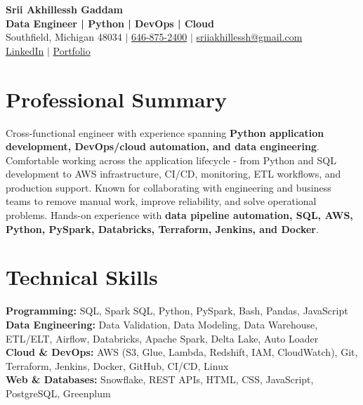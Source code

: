 \documentclass[letterpaper,10pt]{article}
\begin{document}
\fontsize{9.35pt}{10.45pt}\selectfont

\begin{center}
    {\LARGE \textbf{Srii Akhillessh Gaddam}} \\[-1pt]
    \textbf{Data Engineer | Python | DevOps | Cloud} \\[2pt]
    Southfield, Michigan 48034 $|$
    \href{tel:6468752400}{646-875-2400} $|$
    \href{mailto:sriiakhillessh@gmail.com}{sriiakhillessh@gmail.com} \\[1pt]
    \href{https://www.linkedin.com/in/srii-akhiilessh-gaddam-b48668191/}{LinkedIn} $|$
    \href{https://sriiakhillesshg.github.io/portfolio/}{Portfolio}
\end{center}
\vspace{-8pt}

\section{Professional Summary}
\small{Cross-functional engineer with experience spanning \textbf{Python application development, DevOps/cloud automation, and data engineering}. Comfortable working across the application lifecycle - from Python and SQL development to AWS infrastructure, CI/CD, monitoring, ETL workflows, and production support. Known for collaborating with engineering and business teams to remove manual work, improve reliability, and solve operational problems. Hands-on experience with \textbf{data pipeline automation, SQL, AWS, Python, PySpark, Databricks, Terraform, Jenkins, and Docker}.}

\section{Technical Skills}
\small{
\textbf{Programming:} SQL, Spark SQL, Python, PySpark, Bash, Pandas, JavaScript \\
\textbf{Data Engineering:} Data Validation, Data Modeling, Data Warehouse, ETL/ELT, Airflow, Databricks, Apache Spark, Delta Lake, Auto Loader \\
\textbf{Cloud \& DevOps:} AWS (S3, Glue, Lambda, Redshift, IAM, CloudWatch), Git, Terraform, Jenkins, Docker, GitHub, CI/CD, Linux \\
\textbf{Web \& Databases:} Snowflake, REST APIs, HTML, CSS, JavaScript, PostgreSQL, Greenplum
}
\end{document}
